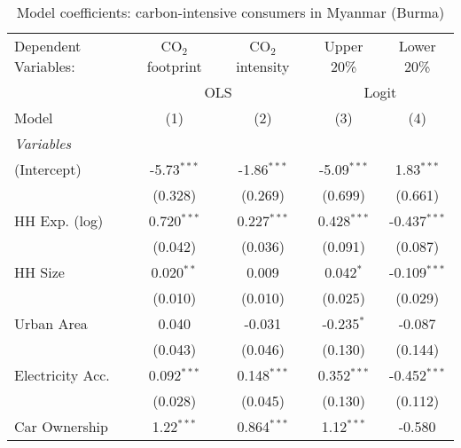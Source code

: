 
\begin{table}[htbp!]
   \centering
   \small
   \begin{adjustbox}{width = 1\textwidth, max height = 0.95\textheight, center}
      \begin{threeparttable}[b]
         \caption{\label{tab:Logit_1_MMR} Model coefficients: carbon-intensive consumers in Myanmar (Burma)}
         \begin{tabular}{lcccc}
            \tabularnewline \midrule \midrule
            Dependent Variables: & CO$_{2}$ footprint & CO$_{2}$ intensity & Upper 20\%    & Lower 20\%\\   
             & \multicolumn{2}{c}{OLS} & \multicolumn{2}{c}{Logit} \\ 
            Model                & (1)                & (2)                & (3)           & (4)\\  
            \midrule
            \emph{Variables}\\
            (Intercept)          & -5.73$^{***}$      & -1.86$^{***}$      & -5.09$^{***}$ & 1.83$^{***}$\\   
                                 & (0.328)            & (0.269)            & (0.699)       & (0.661)\\   
            HH Exp. (log)        & 0.720$^{***}$      & 0.227$^{***}$      & 0.428$^{***}$ & -0.437$^{***}$\\   
                                 & (0.042)            & (0.036)            & (0.091)       & (0.087)\\   
            HH Size              & 0.020$^{**}$       & 0.009              & 0.042$^{*}$   & -0.109$^{***}$\\   
                                 & (0.010)            & (0.010)            & (0.025)       & (0.029)\\   
            Urban Area           & 0.040              & -0.031             & -0.235$^{*}$  & -0.087\\   
                                 & (0.043)            & (0.046)            & (0.130)       & (0.144)\\   
            Electricity Acc.     & 0.092$^{***}$      & 0.148$^{***}$      & 0.352$^{***}$ & -0.452$^{***}$\\   
                                 & (0.028)            & (0.045)            & (0.130)       & (0.112)\\   
            Car Ownership        & 1.22$^{***}$       & 0.864$^{***}$      & 1.12$^{***}$  & -0.580\\   

\end{tabular}
\end{threeparttable}
\end{adjustbox}
\end{table}
